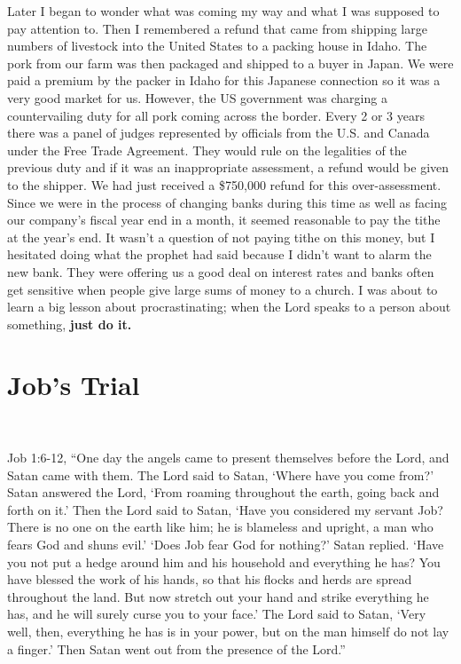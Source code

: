 \documentclass[twoside, 12pt]{book}
\begin{document}
Later I began to wonder what was coming my way and what I was supposed to pay attention to. Then I remembered a refund that came from shipping large numbers of livestock into the United States to a packing house in Idaho. The pork from our farm was then packaged and shipped to a buyer in Japan. We were paid a premium by the packer in Idaho for this Japanese connection so it was a very good market for us. However, the US government was charging a countervailing duty for all pork coming across the border. Every 2 or 3 years there was a panel of judges represented by officials from the U.S. and Canada under the Free Trade Agreement. They would rule on the legalities of the previous duty and if it was an inappropriate assessment, a refund would be given to the shipper. We had just received a \$750,000 refund for this over-assessment. Since we were in the process of changing banks during this time as well as facing our company’s fiscal year end in a month, it seemed reasonable to pay the tithe at the year’s end. It wasn’t a question of not paying tithe on this money, but I hesitated doing what the prophet had said because I didn't want to alarm the new bank. They were offering us a good deal on interest rates and banks often get sensitive when people give large sums of money to a church. I was about to learn a big lesson about procrastinating; when the Lord speaks to a person about something, \textbf{just do it.}


\section{Job's Trial}
\

Job 1:6-12, “One day the angels came to present themselves before the Lord, and Satan came with them. The Lord said to Satan, ‘Where have you come from?’ Satan answered the Lord, ‘From roaming throughout the earth, going back and forth on it.’ Then the Lord said to Satan, ‘Have you considered my servant Job? There is no one on the earth like him; he is blameless and upright, a man who fears God and shuns evil.’ ‘Does Job fear God for nothing?’ Satan replied. ‘Have you not put a hedge around him and his household and everything he has? You have blessed the work of his hands, so that his flocks and herds are spread throughout the land. But now stretch out your hand and strike everything he has, and he will surely curse you to your face.’ The Lord said to Satan, ‘Very well, then, everything he has is in your power, but on the man himself do not lay a finger.’ Then Satan went out from the presence of the Lord.”
\end{document}
